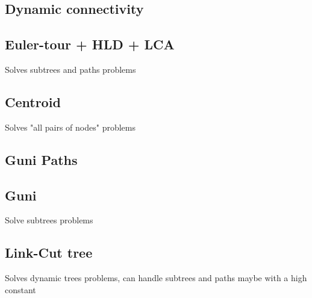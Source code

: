 
\subsection{Dynamic connectivity }

\subsection{Euler-tour + HLD + LCA }

Solves subtrees and paths problems \\


\subsection{Centroid }

Solves "all pairs of nodes" problems \\


\subsection{Guni Paths }

\subsection{Guni }

Solve subtrees problems\\


\subsection{Link-Cut tree }

Solves dynamic trees problems, can handle subtrees and paths maybe with a high constant\\
